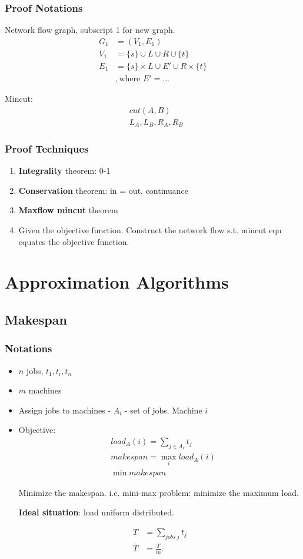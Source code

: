 \documentclass[a4paper]{report}
\theoremstyle{definition}
\begin{document}
\subsection{Proof Notations}\label{sec:networkFlowNotations}
Network flow graph, subscript 1 for new graph.
\begin{align*}
G_1 &= (V_1, E_1) \\  
V_1 &= \{s\} \cup L \cup R \cup \{t\} \\
E_1 &= \{s\} \times L \cup E' \cup  R\times \{t\} \\
& , \text{where  } E' =...
\end{align*}

Mincut:
\begin{align*}
& cut(A, B) \\ 
& L_A, L_B, R_A, R_B
\end{align*}


\subsection{Proof Techniques}
\begin{enumerate}
\item \textbf{Integrality} theorem: 0-1
\item \textbf{Conservation} theorem: in = out, continuance
\item \textbf{Maxflow mincut} theorem 
\item Given the objective function. Construct the network flow s.t. mincut eqn equates the objective function. 
\end{enumerate}

\chapter{Approximation Algorithms}
\section{Makespan}
\subsection{Notations}
\begin{itemize}
\item $n$ jobs, $t_1, t_i, t_n$
\item $m$ machines
\item Assign jobs to machines - $A_i$ - set of jobs. Machine $i$
\item Objective:
\begin{align*}
&load_A(i)=\sum_{j\in A_i} t_j\\
&makespan = \max_i load_A(i)\\
&\min makespan
\end{align*}

Minimize the makespan. i.e. mini-max problem: minimize the maximum load.

\textbf{Ideal situation}: load uniform distributed.

\begin{align*}
T&=\sum_{jobs~j}t_j\\
\bar T &= \frac{T}{m}.
\end{align*}
\end{itemize}
\end{document}
